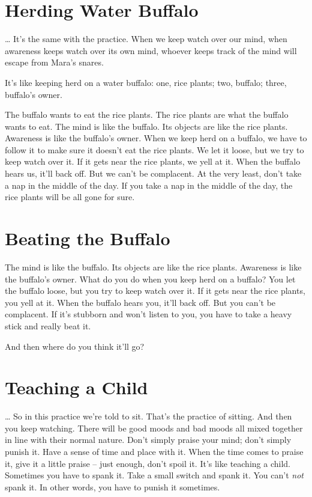 \clearpage

\section{Herding Water Buffalo}

\ldots{} It's the same with the practice. When we keep watch over our mind, when awareness keeps watch over its own mind, whoever keeps track of the mind will escape from Mara's snares.

It's like keeping herd on a water buffalo: one, rice plants; two, buffalo; three, buffalo's owner. 

The buffalo wants to eat the rice plants. The rice plants are what the buffalo wants to eat. The mind is like the buffalo. Its objects are like the rice plants. Awareness is like the buffalo's owner. When we keep herd on a buffalo, we have to follow it to make sure it doesn't eat the rice plants. We let it loose, but we try to keep watch over it. If it gets near the rice plants, we yell at it. When the buffalo hears us, it'll back off. But we can't be complacent. At the very least, don't take a nap in the middle of the day. If you take a nap in the middle of the day, the rice plants will be all gone for sure.

\clearpage

\section{Beating the Buffalo}

The mind is like the buffalo. Its objects are like the rice plants. Awareness is like the buffalo's owner. What do you do when you keep herd on a buffalo? You let the buffalo loose, but you try to keep watch over it. If it gets near the rice plants, you yell at it. When the buffalo hears you, it'll back off. But you can't be complacent. If it's stubborn and won't listen to you, you have to take a heavy stick and really beat it. 

And then where do you think it'll go? 

\section{Teaching a Child}

\ldots{} So in this practice we're told to sit. That's the practice of sitting. And then you keep watching. There will be good moods and bad moods all mixed together in line with their normal nature. Don't simply praise your mind; don't simply punish it. Have a sense of time and place with it. When the time comes to praise it, give it a little praise -- just enough, don't spoil it. It's like teaching a child. Sometimes you have to spank it. Take a small switch and spank it. You can't \textit{not} spank it. In other words, you have to punish it sometimes. 

